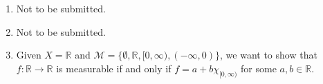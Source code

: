 \documentclass[12pt]{article}
\theoremstyle{plain}
\theoremstyle{definition}
\theoremstyle{remark}
\begin{document}
\begin{enumerate}
\newpage
\item  Not to be submitted.
    
%
%


\item Not to be submitted.


\item Given $X=\mathbb{R}$ and $\mathscr{M} = \{\emptyset, \mathbb{R}, [0,\infty), (-\infty,0)\}$, we want to show that $f:\mathbb{R}\rightarrow\mathbb{R}$ is measurable if and only if $f=a+b\chi_{[0,\infty)}$ for some $a,b\in\mathbb{R}$. 
    

\end{enumerate}
\end{document}
